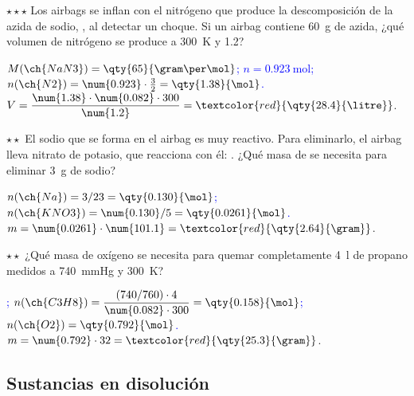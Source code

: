 \begin{exercise}
    \(\star\star\star\) Los airbags se inflan con el nitrógeno que produce la descomposición de la azida de sodio,
    , al detectar un choque. Si un airbag contiene \qty{60}{\gram} de azida, ¿qué volumen de
    nitrógeno se produce a \qty{300}{\kelvin} y \qty{1.2}{\atm}?
    \begin{solu}
        \textcolor{blue}{\(M(\ch{NaN3}) = \qty{65}{\gram\per\mol}\); \(n = \qty{0.923}{\mol}\); \(n(\ch{N2}) = \num{0.923} \cdot \frac{3}{2} =
        \qty{1.38}{\mol}\).} \(V = \dfrac{\num{1.38} \cdot \num{0.082} \cdot 300}{\num{1.2}} = \textcolor{red}{\qty{28.4}{\litre}}\).
    \end{solu}
\end{exercise}

\begin{exercise}
    \(\star\star\) El sodio que se forma en el airbag es muy reactivo. Para eliminarlo, el airbag lleva nitrato de potasio, que
    reacciona con él: . ¿Qué masa de  se necesita para eliminar \qty{3}{\gram}
    de sodio?
    \begin{solu}
        \textcolor{blue}{\(n(\ch{Na}) = 3/23 = \qty{0.130}{\mol}\); \(n(\ch{KNO3}) = \num{0.130}/5 = \qty{0.0261}{\mol}\).}
        \(m = \num{0.0261} \cdot \num{101.1} = \textcolor{red}{\qty{2.64}{\gram}}\).
    \end{solu}
\end{exercise}

\begin{exercise}
    \(\star\star\) ¿Qué masa de oxígeno se necesita para quemar completamente \qty{4}{\litre} de propano medidos a
    \qty{740}{\mmHg} y \qty{300}{\kelvin}?
    \begin{solu}
        \textcolor{blue}{; \(n(\ch{C3H8}) = \dfrac{(740/760) \cdot 4}{\num{0.082} \cdot 300} =
        \qty{0.158}{\mol}\); \(n(\ch{O2}) = \qty{0.792}{\mol}\).} \(m = \num{0.792} \cdot 32 = \textcolor{red}{\qty{25.3}{\gram}}\).
    \end{solu}
\end{exercise}

\subsection{Sustancias en disolución}

